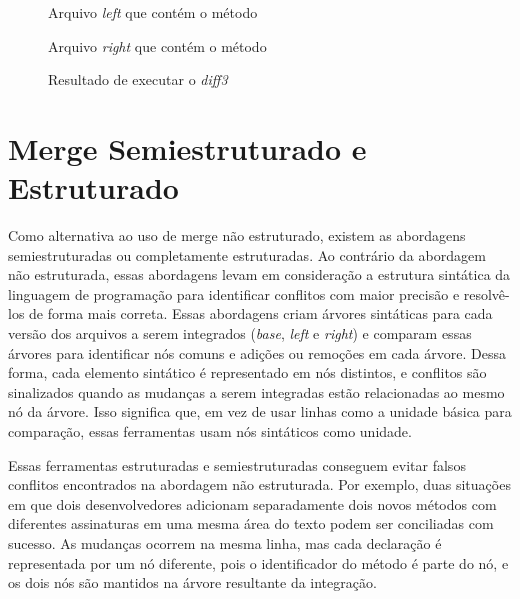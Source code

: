 \begin{figure}[ht]
	\begin{center}
		
		\caption{Arquivo \emph{left} que contém o método }\label{left_example}
	\end{center}
\end{figure}

\begin{figure}[ht]
	\begin{center}
		
		\caption{Arquivo \emph{right} que contém o método }\label{right_example}
	\end{center}
\end{figure}

\begin{figure}[ht]
	\begin{center}
		
	\end{center}
	\caption{Resultado de executar o \emph{diff3}}\label{diff3_example}
\end{figure}

\section{Merge Semiestruturado e Estruturado}
Como alternativa ao uso de merge não estruturado, existem as abordagens
semiestruturadas ou completamente estruturadas. Ao contrário da abordagem não
estruturada, essas abordagens levam em consideração a estrutura sintática da
linguagem de programação para identificar conflitos com maior precisão e resolvê-los de
forma mais correta. Essas abordagens criam árvores sintáticas para
cada versão dos arquivos a serem integrados (\emph{base}, \emph{left} e \emph{right})
e comparam essas árvores para identificar nós comuns
e adições ou remoções em cada árvore. Dessa forma, cada elemento sintático
é representado em nós distintos, e conflitos são sinalizados quando as mudanças
a serem integradas estão relacionadas ao mesmo nó da árvore. Isso significa
que, em vez de usar linhas como a unidade básica para comparação, essas ferramentas usam
nós sintáticos como unidade.

Essas ferramentas estruturadas e semiestruturadas conseguem evitar falsos conflitos
encontrados na abordagem não estruturada. Por exemplo, duas situações em
que dois desenvolvedores adicionam separadamente dois novos métodos com diferentes
assinaturas em uma mesma área do texto podem ser conciliadas com sucesso.
As mudanças ocorrem na mesma linha, mas cada declaração é representada por
um nó diferente, pois o identificador do método é parte do nó,
e os dois nós são mantidos na árvore resultante da integração.


